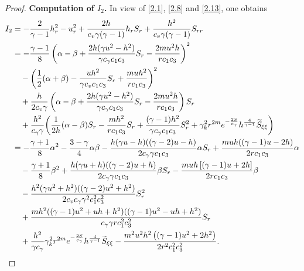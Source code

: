 \documentclass[10pt,a4paper]{amsart}
\begin{document}
\begin{proof}
\noindent\textbf{Computation of $I_2$.}
In view of \eqref{2.1}, \eqref{2.8} and \eqref{2.13}, one obtains
\begin{align}
I_2 &=-\frac{2}{\gamma-1}h_r^2-u_r^2+\frac{2h}{c_v\gamma(\gamma-1)}h_rS_r
  +\frac{h^2}{c_v\gamma(\gamma-1)}S_{rr}\nonumber\\
  &= -\frac{\gamma-1}{8} \left( \alpha-\beta + \frac{2h(\gamma u^2-h^2)}{\gamma c_\gamma c_1c_3} S_r - \frac{2m u^2 h}{r c_1 c_3} \right)^2 \nonumber\\
  &\quad -\left(\frac12(\alpha+\beta) - \frac{uh^2}{\gamma c_v c_1c_3} S_r + \frac{m u h^2}{r c_1 c_3} \right)^2 \nonumber\\
  &\quad + \frac{h}{2c_v \gamma} \left( \alpha-\beta + \frac{2h(\gamma u^2-h^2)}{\gamma c_\gamma c_1c_3} S_r - \frac{2m u^2 h}{r c_1 c_3} \right) S_r \nonumber\\
  &\quad + \frac{h^2}{c_{\gamma} \gamma } \bigg( \frac{1}{2h}(\alpha-\beta) S_r - \frac{m h^2}{r c_1 c_3} S_r + \frac{(\gamma-1) h^2}{\gamma c_\gamma c_1 c_3} S_r^2 + \gamma_k^2 r^{2m} e^{-\frac{2S}{c_\gamma}} h^{\frac{4}{\gamma-1}} \widetilde{S}_{\xi\xi} \bigg)\nonumber\\
  &=  -\frac{\gamma + 1}{8}\alpha^2 - \frac{3 - \gamma}{4}\alpha\beta - \frac{h(\gamma u - h)((\gamma - 2)u - h)}{2c_{\gamma} \gamma c_1 c_3}\alpha S_r + \frac{muh((\gamma - 1)u - 2h)}{2r c_1 c_3}\alpha  \nonumber\\
  &\quad-\frac{\gamma + 1}{8}\beta^2 + \frac{h(\gamma u + h)((\gamma - 2)u + h)}{2c_{\gamma} \gamma c_1 c_3}\beta S_r - \frac{muh\left[ (\gamma - 1)u + 2h \right]}{2r c_1 c_3}\beta \nonumber\\
  &\quad - \frac{h^2(\gamma u^2 + h^2)((\gamma - 2)u^2 + h^2)}{2c_v c_{\gamma} \gamma^2 c_1^2 c_3^2}S_r^2 \nonumber\\
  &\quad+\frac{mh^2((\gamma - 1)u^2 + uh + h^2)((\gamma - 1)u^2 - uh + h^2)}{c_{\gamma} \gamma r c_1^2 c_3^2}S_r \nonumber\\
   &\quad +  \frac{ h^2}{\gamma c_{\gamma} } \gamma_k^2 r^{2m} e^{-\frac{2S}{c_\gamma}} h^{\frac{4}{\gamma-1}}  \widetilde{S}_{\xi\xi}-\frac{m^2 u^2 h^2 \left( (\gamma - 1)u^2 + 2h^2 \right)}{2r^2 c_1^2 c_3^2}. \notag
\end{align}


\end{proof}
\end{document}
